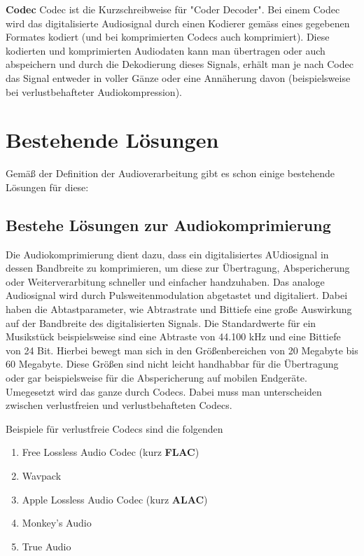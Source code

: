\documentclass[paper=a4,fontsize=12pt,ngerman]{scrartcl}
\begin{document}
\textbf{Codec}
Codec ist die Kurzschreibweise für "Coder Decoder". Bei einem Codec wird das
digitalisierte Audiosignal durch einen Kodierer gemäss eines gegebenen Formates
kodiert (und bei komprimierten Codecs auch komprimiert). Diese kodierten und
komprimierten Audiodaten kann man übertragen oder auch abspeichern und durch
die Dekodierung dieses Signals, erhält man je nach Codec das Signal entweder in
voller Gänze oder eine Annäherung davon (beispielsweise bei verlustbehafteter Audiokompression).

\label{BL}
\section{Bestehende Lösungen}
Gemäß der Definition der Audioverarbeitung gibt es schon einige bestehende Lösungen für diese:

\subsection{Bestehe Lösungen zur Audiokomprimierung}
Die Audiokomprimierung dient dazu, dass ein digitalisiertes AUdiosignal in dessen Bandbreite zu komprimieren, um diese zur Übertragung, Abspericherung oder Weiterverarbitung schneller und einfacher handzuhaben. 
Das analoge Audiosignal wird durch Pulsweitenmodulation abgetastet und digitaliert. 
Dabei haben die Abtastparameter, wie Abtrastrate und Bittiefe eine große Auswirkung auf der Bandbreite des digitalisierten Signals.
Die Standardwerte für ein Musikstück beispielsweise sind eine Abtraste von 44.100 kHz und eine Bittiefe von 24 Bit. 
Hierbei bewegt man sich in den Größenbereichen von 20 Megabyte bis 60 Megabyte. 
Diese Größen sind nicht leicht handhabbar für die Übertragung oder gar beispielsweise für die Abspericherung auf mobilen Endgeräte.
Umegesetzt wird das ganze durch Codecs. Dabei muss man unterscheiden zwischen verlustfreien und verlustbehafteten Codecs.

Beispiele für verlustfreie Codecs sind die folgenden \cite{gzmk}

\begin{enumerate}
    \item Free Lossless Audio Codec (kurz \textbf{FLAC}) \cite{rfc9639}
    \item Wavpack \cite{kurtisi2008wavpack}
    \item Apple Lossless Audio Codec (kurz \textbf{ALAC})
    \item Monkey’s Audio
    \item True Audio
\end{enumerate}
\end{document}
